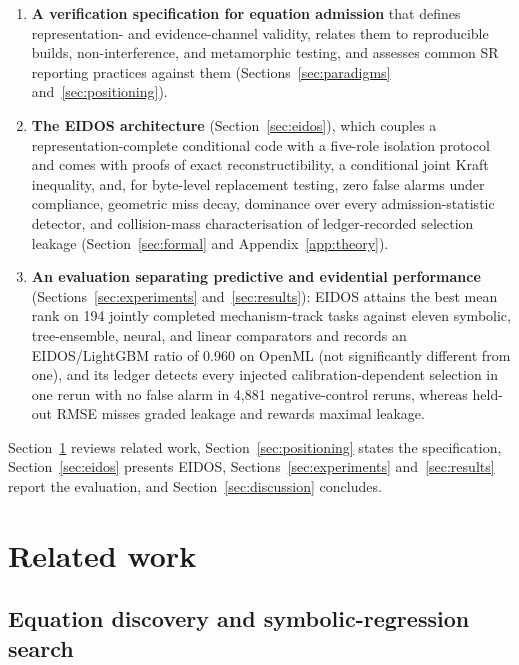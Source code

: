 \begin{enumerate}
\item \textbf{A verification specification for equation admission} that defines representation- and evidence-channel validity, relates them to reproducible builds, non-interference, and metamorphic testing, and assesses common SR reporting practices against them (Sections~\ref{sec:paradigms} and~\ref{sec:positioning}).
\item \textbf{The EIDOS architecture} (Section~\ref{sec:eidos}), which couples a representation-complete conditional code with a five-role isolation protocol and comes with proofs of exact reconstructibility, a conditional joint Kraft inequality, and, for byte-level replacement testing, zero false alarms under compliance, geometric miss decay, dominance over every admission-statistic detector, and collision-mass characterisation of ledger-recorded selection leakage (Section~\ref{sec:formal} and Appendix~\ref{app:theory}).
\item \textbf{An evaluation separating predictive and evidential performance} (Sections~\ref{sec:experiments} and~\ref{sec:results}): EIDOS attains the best mean rank on 194 jointly completed mechanism-track tasks against eleven symbolic, tree-ensemble, neural, and linear comparators and records an EIDOS/LightGBM ratio of 0.960 on OpenML (not significantly different from one), and its ledger detects every injected calibration-dependent selection in one rerun with no false alarm in 4{,}881 negative-control reruns, whereas held-out RMSE misses graded leakage and rewards maximal leakage.
\end{enumerate}
Section~\ref{sec:related} reviews related work, Section~\ref{sec:positioning} states the specification, Section~\ref{sec:eidos} presents EIDOS, Sections~\ref{sec:experiments} and~\ref{sec:results} report the evaluation, and Section~\ref{sec:discussion} concludes.

\section{Related work}\label{sec:related}

\subsection{Equation discovery and symbolic-regression search}


